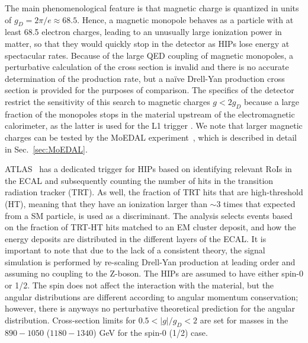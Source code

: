 The main phenomenological feature is that magnetic charge is quantized in units of $g_D = 2\pi/e \approx 68.5$. Hence, a magnetic monopole behaves as a particle with at least 68.5 electron charges, leading to an unusually large ionization power in matter, so that they would quickly stop in the detector as HIPs lose energy at spectacular rates. Because of the large QED coupling of magnetic monopoles, a perturbative calculation of the cross section is invalid and there is no accurate determination of the production rate, but a na\"ive Drell-Yan production cross section is provided for the purposes of comparison. The specifics of the detector restrict the sensitivity of this search to magnetic charges $g < 2 g_D$ because a large fraction of the monopoles stops in the material upstream of the electromagnetic calorimeter, as the latter is used for the L1 trigger  \cite{DeRoeck:2011aa}. We note that larger magnetic charges can be tested by the MoEDAL experiment~\cite{MoEDAL:2016jlb}, which is described in detail in Sec.~\ref{sec:MoEDAL}.

ATLAS~\cite{Aad:2015kta}  has a dedicated trigger for HIPs based on identifying relevant RoIs in the ECAL and subsequently counting the number of hits in the transition radiation tracker (TRT). As well, the fraction of TRT hits that are high-threshold (HT), meaning that they have an ionization larger than $\sim3$ times that expected from a SM particle, is used as a discriminant. The analysis selects events based on the fraction of TRT-HT hits matched to an EM cluster deposit, and how the energy deposits are distributed in the different layers of the ECAL. It is important to note that due to the lack of a consistent theory, the signal simulation is performed by re-scaling Drell-Yan production at leading order and assuming no coupling to the Z-boson. The HIPs are assumed to have either spin-0 or 1/2. The spin does not affect the interaction with the material, but the angular distributions are different according to angular momentum conservation; however, there is anyways no perturbative theoretical prediction for the angular distribution. Cross-section limits for $0.5 < |g|/g_D < 2$ are set for masses in the $890-1050$ ($1180-1340$) GeV for the spin-0 (1/2) case.

